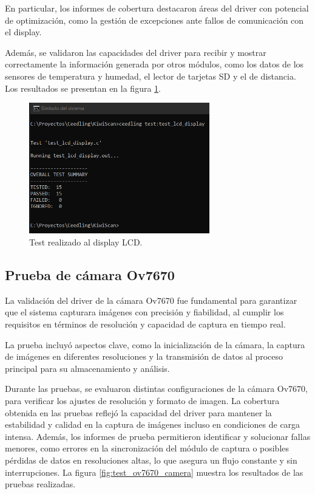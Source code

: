 En particular, los informes de cobertura destacaron áreas del driver con potencial de optimización, como la gestión de excepciones ante fallos de comunicación con el display.

Además, se validaron las capacidades del driver para recibir y mostrar correctamente la información generada por otros módulos, como los datos de los sensores de temperatura y humedad, el lector de tarjetas SD y el de distancia. Los resultados se presentan en la figura \ref{fig:test_lcd_display}.

\vspace{1cm}

\begin{figure}[htbp]
	\centering
	\includegraphics[width=0.7\textwidth, height=0.3\textheight]{./Figures/test_lcd_display.png}
	\caption{Test realizado al display LCD.}
	\label{fig:test_lcd_display}
\end{figure}

\vspace{1cm}

\subsection{Prueba de cámara Ov7670}

La validación del driver de la cámara Ov7670 fue fundamental para garantizar que el sistema capturara imágenes con precisión y fiabilidad, al cumplir los requisitos en términos de resolución y capacidad de captura en tiempo real.

La prueba incluyó aspectos clave, como la inicialización de la cámara, la captura de imágenes en diferentes resoluciones y la transmisión de datos al proceso principal para su almacenamiento y análisis.

Durante las pruebas, se evaluaron distintas configuraciones de la cámara Ov7670, para verificar los ajustes de resolución y formato de imagen. La cobertura obtenida en las pruebas reflejó la capacidad del driver para mantener la estabilidad y calidad en la captura de imágenes incluso en condiciones de carga intensa. Además, los informes de prueba permitieron identificar y solucionar fallas menores, como errores en la sincronización del módulo de captura o posibles pérdidas de datos en resoluciones altas, lo que asegura un flujo constante y sin interrupciones. La figura \ref{fig:test_ov7670_camera}
muestra los resultados de las pruebas realizadas.

